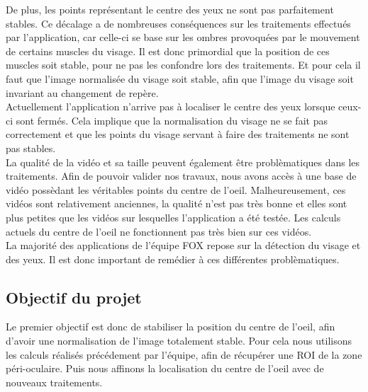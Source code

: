 De plus, les points représentant le centre des yeux ne sont pas parfaitement stables. Ce décalage a de 
nombreuses conséquences sur les traitements effectués par l'application, car celle-ci se base sur 
les ombres provoquées par le mouvement de certains muscles du 
visage. Il est donc primordial que la position de ces muscles soit stable, pour ne pas les confondre
lors des traitements. Et pour cela il faut que l'image normalisée du visage soit stable, afin que l'image
du visage soit invariant au changement de repère.\\

Actuellement l'application n'arrive pas à localiser le centre des yeux lorsque ceux-ci sont fermés. 
Cela implique que la normalisation du visage ne se fait pas correctement et que les points du
visage servant à faire des traitements ne sont pas stables.\\

La qualité de la vidéo et sa taille peuvent également être problèmatiques dans les traitements. Afin de
pouvoir valider nos travaux, nous avons accès à une base de vidéo possèdant les véritables points
du centre de l'oeil. Malheureusement, ces vidéos sont relativement anciennes, la qualité n'est pas 
très bonne et elles sont plus petites que les vidéos sur lesquelles l'application a été testée. Les 
calculs actuels du centre de l'oeil ne fonctionnent pas très bien sur ces vidéos.\\

La majorité des applications de l'équipe FOX repose sur la détection du visage et des yeux. Il est donc 
important de remédier à ces différentes problèmatiques.\\

\subsection{Objectif du projet}

Le premier objectif est donc de stabiliser la position du centre de l'oeil, afin d'avoir une normalisation de l'image
totalement stable. Pour cela nous utilisons les calculs réalisés précédement par l'équipe, afin de récupérer une ROI de la zone péri-oculaire. Puis
nous affinons la localisation du centre de l'oeil avec de nouveaux traitements.\\

